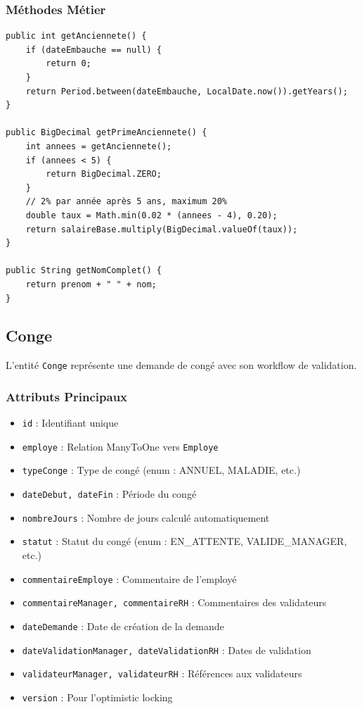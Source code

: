 \documentclass[12pt,a4paper,twoside]{report}
\begin{document}
\subsubsection{Méthodes Métier}

\begin{lstlisting}[caption=Méthodes de calcul d'ancienneté et prime, label=lst:anciennete]
public int getAnciennete() {
    if (dateEmbauche == null) {
        return 0;
    }
    return Period.between(dateEmbauche, LocalDate.now()).getYears();
}

public BigDecimal getPrimeAnciennete() {
    int annees = getAnciennete();
    if (annees < 5) {
        return BigDecimal.ZERO;
    }
    // 2% par année après 5 ans, maximum 20%
    double taux = Math.min(0.02 * (annees - 4), 0.20);
    return salaireBase.multiply(BigDecimal.valueOf(taux));
}

public String getNomComplet() {
    return prenom + " " + nom;
}
\end{lstlisting}

\subsection{Conge}

L'entité \texttt{Conge} représente une demande de congé avec son workflow de validation.

\subsubsection{Attributs Principaux}
\begin{itemize}
    \item \texttt{id} : Identifiant unique
    \item \texttt{employe} : Relation ManyToOne vers \texttt{Employe}
    \item \texttt{typeConge} : Type de congé (enum : ANNUEL, MALADIE, etc.)
    \item \texttt{dateDebut, dateFin} : Période du congé
    \item \texttt{nombreJours} : Nombre de jours calculé automatiquement
    \item \texttt{statut} : Statut du congé (enum : EN\_ATTENTE, VALIDE\_MANAGER, etc.)
    \item \texttt{commentaireEmploye} : Commentaire de l'employé
    \item \texttt{commentaireManager, commentaireRH} : Commentaires des validateurs
    \item \texttt{dateDemande} : Date de création de la demande
    \item \texttt{dateValidationManager, dateValidationRH} : Dates de validation
    \item \texttt{validateurManager, validateurRH} : Références aux validateurs
    \item \texttt{version} : Pour l'optimistic locking
\end{itemize}
\end{document}
